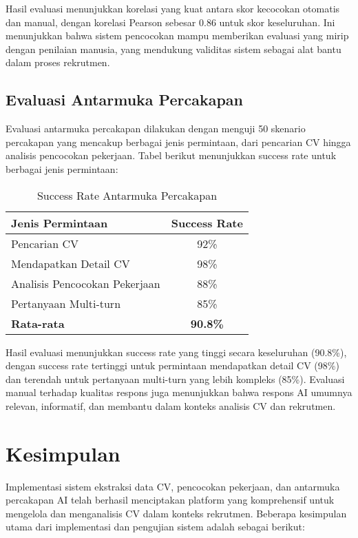 Hasil evaluasi menunjukkan korelasi yang kuat antara skor kecocokan otomatis dan manual, dengan korelasi Pearson sebesar 0.86 untuk skor keseluruhan. Ini menunjukkan bahwa sistem pencocokan mampu memberikan evaluasi yang mirip dengan penilaian manusia, yang mendukung validitas sistem sebagai alat bantu dalam proses rekrutmen.

\subsection{Evaluasi Antarmuka Percakapan}
Evaluasi antarmuka percakapan dilakukan dengan menguji 50 skenario percakapan yang mencakup berbagai jenis permintaan, dari pencarian CV hingga analisis pencocokan pekerjaan. Tabel berikut menunjukkan success rate untuk berbagai jenis permintaan:

\begin{table}[h]
\centering
\begin{tabular}{|l|c|}
\hline
\textbf{Jenis Permintaan} & \textbf{Success Rate} \\
\hline
Pencarian CV & 92\% \\
Mendapatkan Detail CV & 98\% \\
Analisis Pencocokan Pekerjaan & 88\% \\
Pertanyaan Multi-turn & 85\% \\
\hline
\textbf{Rata-rata} & \textbf{90.8\%} \\
\hline
\end{tabular}
\caption{Success Rate Antarmuka Percakapan}
\end{table}

Hasil evaluasi menunjukkan success rate yang tinggi secara keseluruhan (90.8\%), dengan success rate tertinggi untuk permintaan mendapatkan detail CV (98\%) dan terendah untuk pertanyaan multi-turn yang lebih kompleks (85\%). Evaluasi manual terhadap kualitas respons juga menunjukkan bahwa respons AI umumnya relevan, informatif, dan membantu dalam konteks analisis CV dan rekrutmen.

\section{Kesimpulan}
Implementasi sistem ekstraksi data CV, pencocokan pekerjaan, dan antarmuka percakapan AI telah berhasil menciptakan platform yang komprehensif untuk mengelola dan menganalisis CV dalam konteks rekrutmen. Beberapa kesimpulan utama dari implementasi dan pengujian sistem adalah sebagai berikut:

